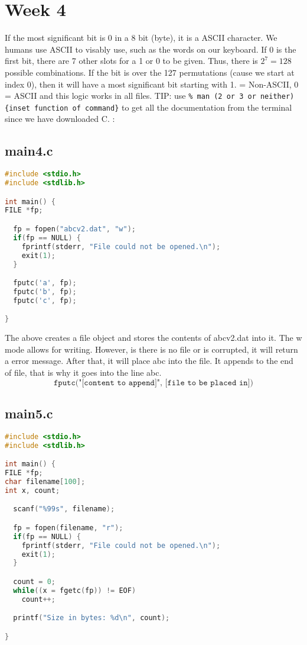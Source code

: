 \documentclass{article}
\begin{document}
\section*{Week 4}
If the most significant bit is 0 in a 8 bit (byte), it is a ASCII character. We humans use ASCII to visably use, such as the words on our keyboard. If 0 is the first bit, there are 7 other slots for a 1 or 0 to be given. Thus, there is \(2^7=128\) possible combinations. If the bit is over the 127 permutations (cause we start at index 0), then it will have a most significant bit starting with 1.  = Non-ASCII, 0 = ASCII and this logic works in all files.\newline
TIP: use \texttt{\% man (2 or 3 or neither) \{inset function of command\}} to get all the documentation from the terminal since we have downloaded C. 
:

\subsection*{main4.c}

\begin{lstlisting}[language=C]
#include <stdio.h>
#include <stdlib.h>

int main() {
FILE *fp;

  fp = fopen("abcv2.dat", "w");
  if(fp == NULL) {
	fprintf(stderr, "File could not be opened.\n");
	exit(1);
  }

  fputc('a', fp);
  fputc('b', fp);
  fputc('c', fp);

}
\end{lstlisting}

The above creates a file object and stores the contents of abcv2.dat into it. The w mode allows for writing. However, is there is no file or is corrupted, it will return a error message. \newline
After that, it will place abc into the file. It appends to the end of file, that is why it goes into the line abc. \newline
\[\texttt{fputc("[content to append]", [file to be placed in])}\]

\subsection*{main5.c}

\begin{lstlisting}[language=C]
#include <stdio.h>
#include <stdlib.h>

int main() {
FILE *fp;
char filename[100];
int x, count;

  scanf("%99s", filename);

  fp = fopen(filename, "r");
  if(fp == NULL) {
	fprintf(stderr, "File could not be opened.\n");
	exit(1);
  }

  count = 0;
  while((x = fgetc(fp)) != EOF)
	count++;

  printf("Size in bytes: %d\n", count);

}
\end{lstlisting}
\end{document}

